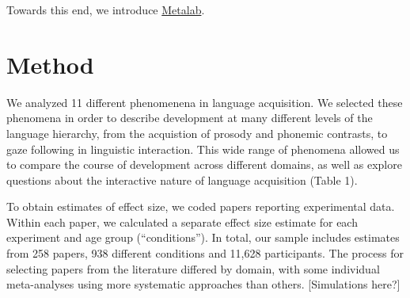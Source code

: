 \documentclass[american,floatsintext,man]{apa6}
\begin{document}
Towards this end, we introduce
\href{http://metalab.stanford.edu/}{Metalab}.

\section{Method}\label{method}

We analyzed 11 different phenomenena in language acquisition. We
selected these phenomena in order to describe development at many
different levels of the language hierarchy, from the acquistion of
prosody and phonemic contrasts, to gaze following in linguistic
interaction. This wide range of phenomena allowed us to compare the
course of development across different domains, as well as explore
questions about the interactive nature of language acquisition (Table
1).

To obtain estimates of effect size, we coded papers reporting
experimental data. Within each paper, we calculated a separate effect
size estimate for each experiment and age group (\enquote{conditions}).
In total, our sample includes estimates from 258 papers, 938 different
conditions and 11,628 participants. The process for selecting papers
from the literature differed by domain, with some individual
meta-analyses using more systematic approaches than others.
{[}Simulations here?{]} \renewcommand{\arraystretch}{1.5}
\end{document}
